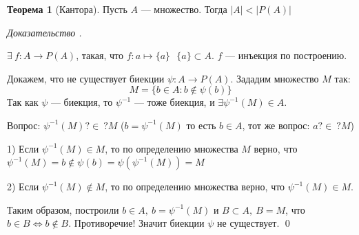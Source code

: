 \documentclass[12pt,oneside]{article}
\theoremstyle{definition}
\newtheorem{theorem}{Теорема}[section]
\newenvironment{ourproof}[1]{\textit{Доказательство #1.}}{\qed}
\begin{document}
\begin{theorem}[Кантора]\label{Kantor}
Пусть $A$ --- множество. Тогда $|A|<|P(A)|$

\begin{ourproof}{}

$\exists\ f : A \longrightarrow P(A)$, такая, что $f: a\mapsto \{a\}\ \ \ \{a\}\subset A$. $f$ --- инъекция по построению.

Докажем, что не существует биекции $\psi : A \longrightarrow P(A)$. Зададим множество $M$ так:
$$M=\{b\in A: b\notin \psi(b)\}$$
Так как $\psi$ --- биекция, то $\psi^{-1}$ --- тоже биекция, и $\exists \psi^{-1}(M)\in A$. 

Вопрос: $\psi^{-1}(M)?\in\ ? M$ ($b=\psi^{-1}(M)$ то есть $b\in A$, тот же вопрос: $a ?\in\ ? M$)

1) Если $\psi^{-1}(M)\in M$, то по определению множества $M$ верно, что $\psi^{-1}(M)=b\notin \psi(b)=\psi(\psi^{-1}(M))=M$

2) Если $\psi^{-1}(M)\notin M$, то по определению множества верно, что
$\psi^{-1}(M)\in M$.

Таким образом, построили $b\in A,\ b=\psi^{-1}(M)$ и $B\subset A,\ B=M$, что $b\in B \Longleftrightarrow b\notin B$. Противоречие! Значит биекции $\psi$ не существует.
\end{ourproof}
\end{theorem}
\end{document}
